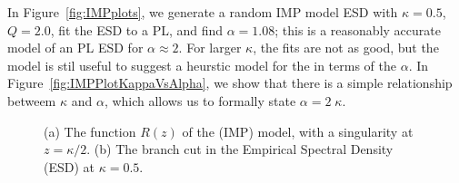 In Figure~\ref{fig:IMPplots}, we generate a random IMP model ESD with $\kappa=0.5$, $Q=2.0$, fit the ESD
to a PL, and find $\alpha=1.08$; this is a reasonably accurate model of an PL ESD for $\alpha\approx 2$.
For larger $\kappa$, the fits are not as good, but the model is stil useful to suggest a heurstic model for the
\LayerQuality in terms of the \HTSR $\alpha$.
In Figure~\ref{fig:IMPPlotKappaVsAlpha}, we show that there is a simple relationship betweem $\kappa$ and $\alpha$,
which allows us to formally state $\alpha=2\;\kappa$.

\begin{figure}[t]
    \centering
    \caption{(a) The function $R(z)$ of the \InverseMP (IMP) model, with a singularity at $z = \kappa/2$. (b) The branch cut in the Empirical Spectral Density (ESD) at $\kappa = 0.5$.}
    \label{fig:R_branch_cut_combined}
\end{figure}

